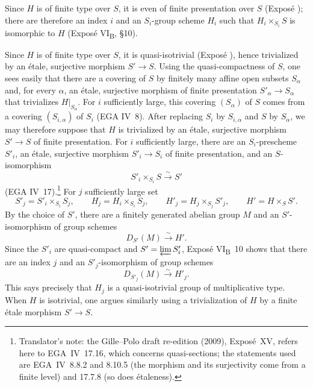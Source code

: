 
Since \(H\) is of finite type over \(S\), it is even of finite
presentation over \(S\) (Exposé ); there are therefore an
index \(i\) and an \(S_i\)-group scheme \(H_i\) such that
\(H_i\times_{S_i}S\) is isomorphic to \(H\)
(Exposé VI\textsubscript{B}, \S10).

Since \(H\) is of finite type over \(S\), it is quasi-isotrivial
(Exposé ), hence trivialized by an étale, surjective
morphism \(S'\to S\). Using the quasi-compactness of \(S\), one sees
easily that there are a covering of \(S\) by finitely many affine open
subsets \(S_\alpha\) and, for every \(\alpha\), an étale, surjective
morphism of finite presentation \(S'_\alpha\to S_\alpha\) that
trivializes \(H|_{S_\alpha}\). For \(i\) sufficiently large, this
covering \((S_\alpha)\) of \(S\) comes from a covering
\((S_{i,\alpha})\) of \(S_i\) (EGA IV~8). After replacing \(S_i\) by
\(S_{i,\alpha}\) and \(S\) by \(S_\alpha\), we may therefore suppose
that \(H\) is trivialized by an étale, surjective morphism
\(S'\to S\) of finite presentation. For \(i\)
sufficiently large, there are an \(S_i\)-prescheme \(S'_i\), an
étale, surjective morphism \(S'_i\to S_i\) of finite presentation,
and an \(S\)-isomorphism
\[
  S'_i\times_{S_i}S\xrightarrow{\sim}S'
\]
(EGA IV~17).\footnote{Translator's note: the Gille--Polo draft
re-edition (2009), Exposé~XV, refers here to EGA~IV~17.16, which
concerns quasi-sections; the statements used are EGA~IV~8.8.2 and
8.10.5 (the morphism and its surjectivity come from a finite level) and
17.7.8 (so does étaleness).} For \(j\) sufficiently large set
\[
  S'_j=S'_i\times_{S_i}S_j,\qquad
  H_j=H_i\times_{S_i}S_j,\qquad
  H'_j=H_j\times_{S_j}S'_j,\qquad
  H'=H\times_S S'.
\]
By the choice of \(S'\), there are a finitely generated abelian
group \(M\) and an \(S'\)-isomorphism of group schemes
\[
  D_{S'}(M)\xrightarrow{\sim}H'.
\]
Since the \(S'_i\) are quasi-compact and
\(S'=\varprojlim S'_i\), Exposé VI\textsubscript{B}~10 shows that
there are an index \(j\) and an \(S'_j\)-isomorphism of group
schemes
\[
  D_{S'_j}(M)\xrightarrow{\sim}H'_j.
\]
This says precisely that \(H_j\) is a quasi-isotrivial group of
multiplicative type. When \(H\) is isotrivial, one argues similarly
using a trivialization of \(H\) by a finite étale morphism
\(S'\to S\).

